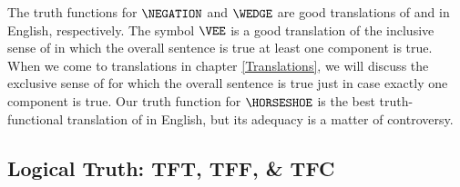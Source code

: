The truth functions for $\NEGATION$ and $\WEDGE$ are good translations of  and  in English, respectively.  The symbol $\VEE$ is a good translation of the inclusive sense of  in which the overall sentence is true \Iff at least one component is true.  When we come to translations in chapter \ref{Translations}, we will discuss the exclusive sense of  for which the overall sentence is true just in case exactly one component is true. Our truth function for $\HORSESHOE$ is the best truth-functional translation of  in English, but its adequacy is a matter of controversy. 

\subsection{Logical Truth: TFT, TFF, \& TFC}\label{TFT TFF TFI}

